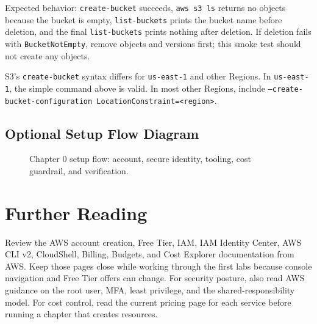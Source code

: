 Expected behavior: \texttt{create-bucket} succeeds, \texttt{aws s3 ls} returns no objects because the bucket is empty, \texttt{list-buckets} prints the bucket name before deletion, and the final \texttt{list-buckets} prints nothing after deletion. If deletion fails with \texttt{BucketNotEmpty}, remove objects and versions first; this smoke test should not create any objects.

\begin{notebox}
S3's \texttt{create-bucket} syntax differs for \texttt{us-east-1} and other Regions. In \texttt{us-east-1}, the simple command above is valid. In most other Regions, include \texttt{--create-bucket-configuration LocationConstraint=<region>}.
\end{notebox}

\subsection{Optional Setup Flow Diagram}
\begin{figure}[H]
    \centering
    \caption{Chapter 0 setup flow: account, secure identity, tooling, cost guardrail, and verification.}
    \label{fig:chapter0-setup-flow}
\end{figure}

\section{Further Reading}
Review the AWS account creation, Free Tier, IAM, IAM Identity Center, AWS CLI v2, CloudShell, Billing, Budgets, and Cost Explorer documentation from AWS. Keep those pages close while working through the first labs because console navigation and Free Tier offers can change. For security posture, also read AWS guidance on the root user, MFA, least privilege, and the shared-responsibility model. For cost control, read the current pricing page for each service before running a chapter that creates resources.

